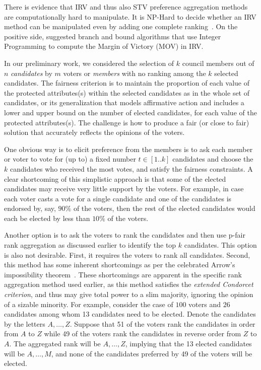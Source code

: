 \documentclass[11pt]{article}
\begin{document}
There is evidence that IRV and thus also STV preference aggregation methods are computationally hard to manipulate. It is NP-Hard to decide whether an IRV method can be manipulated even by adding one complete ranking~\cite{stv2}. On the positive side, \cite{blom2016,blom2019,magrino2011} suggested branch and bound algorithms that use Integer Programming to compute the Margin of Victory (MOV) in IRV. 

\iffalse
In our preliminary work, 
we considered the selection of $k$ council members out of $n$ {\em candidates} by $m$ voters or {\em members} with no ranking among the $k$ selected candidates. The fairness criterion %
is to maintain the proportion of each value of the protected attributes(s) within the selected candidates as in the whole set of candidates, or its generalization that models affirmative action and includes a lower and upper bound on the number of elected candidates, for each value of the protected attributes(s). %
The challenge is how to produce a fair (or close to fair) solution that accurately reflects the opinions of the voters.

One obvious way is to elicit preference from the members is to ask each member or voter to vote for (up to) a fixed number $t \in [1..k]$ candidates and choose the $k$ candidates who received the most votes, and satisfy the fairness constraints. A clear shortcoming of this simplistic approach is that some of the elected candidates may receive very little support by the voters. For example, in case each voter casts a vote for a single candidate and one of the candidates is endorsed by, say, $90\%$ of the voters, then the rest of the elected candidates would each be elected by less than $10\%$ of the voters. 

Another option is to ask the voters to rank the candidates and then use p-fair rank aggregation as discussed earlier to identify the top $k$ candidates. This option is also not desirable. First, it requires the voters to rank all candidates. Second, this method has some inherent shortcomings as per the celebrated Arrow's impossibility theorem~\cite{arrow,fishburn1970arrow}. These shortcomings are apparent in the specific rank aggregation method used earlier, as this method satisfies the {\em extended Condorcet criterion}, and thus may give total power to a slim majority, ignoring the opinion of a sizable minority. For example, consider the case of $100$ voters and $26$ candidates among whom 13 candidates need to be elected.
Denote the candidates by the letters $A,\ldots,Z$. Suppose that 51 of the voters rank the candidates in order from $A$ to $Z$ while 49 of the voters rank the candidates in reverse order from $Z$ to $A$. The aggregated rank will be $A,\ldots,Z$, implying that the 13 elected candidates will be $A,\ldots, M$, and none of the candidates preferred by 49 of the voters will be elected.
\end{document}
